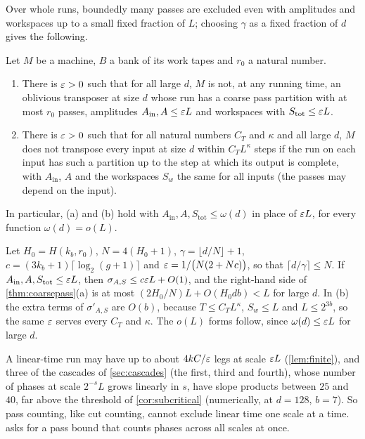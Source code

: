 Over whole runs, boundedly many passes are excluded even with amplitudes and workspaces up to a small fixed fraction of $L$; choosing
$\gamma$ as a fixed fraction of $d$ gives the following.

\begin{corollary}\label{cor:boundedpasses}
Let $M$ be a machine, $B$ a bank of its work tapes and $r_0$ a natural number.
\begin{enumerate}[label=(\alph*)]
\item There is $\varepsilon>0$ such that for all large $d$, $M$ is not, at any running time, an oblivious transposer at size $d$ whose run has a
coarse pass partition with at most $r_0$ passes, amplitudes $A_{\mathrm{in}},A\le\varepsilon L$ and workspaces with $S_{\mathrm{tot}}\le\varepsilon L$.
\item There is $\varepsilon>0$ such that for all natural numbers $C_T$ and $\kappa$ and all large $d$, $M$ does not transpose every input at size
$d$ within $C_TL^\kappa$ steps if the run on each input has such a partition up to the step at which its output is complete, with
$A_{\mathrm{in}}$, $A$ and the workspaces $S_w$ the same for all inputs (the passes may depend on the input).
\end{enumerate}
In particular, (a) and (b) hold with $A_{\mathrm{in}},A,S_{\mathrm{tot}}\le\omega(d)$ in place of $\varepsilon L$, for every function $\omega(d)=o(L)$.
\end{corollary}

\begin{outline}
Let $H_0=H(k_b,r_0)$, $N=4(H_0+1)$, $\gamma=\lfloor d/N\rfloor+1$, $c=(3k_b+1)\lceil\log_2(g+1)\rceil$ and $\varepsilon=1/\bigl(N(2+Nc)\bigr)$, so that
$\lceil d/\gamma\rceil\le N$. If $A_{\mathrm{in}},A,S_{\mathrm{tot}}\le\varepsilon L$, then $\sigma_{A,S}\le c\varepsilon L+O(1)$, and the right-hand side of
\cref{thm:coarsepass}(a) is at most $(2H_0/N)L+O(H_0db)<L$ for large $d$. In (b) the extra terms of $\sigma'_{A,S}$ are $O(b)$, because
$T\le C_TL^\kappa$, $S_w\le L$ and $L\le2^{3b}$, so the same $\varepsilon$ serves every $C_T$ and $\kappa$. The $o(L)$ forms follow, since
$\omega(d)\le\varepsilon L$ for large $d$.
\end{outline}

A linear-time run may have up to about $4kC/\varepsilon$ legs at scale $\varepsilon L$ (\cref{lem:finite}), and three of the cascades of
\cref{sec:cascades} (the first, third and fourth), whose number of phases at scale $2^{-s}L$ grows linearly in $s$, have slope products
between $25$ and $40$, far above the threshold of \cref{cor:subcritical} (numerically, at $d=128$, $b=7$). So pass counting, like cut
counting, cannot exclude linear time one scale at a time. 
asks for a pass bound that counts phases across all scales at once.


